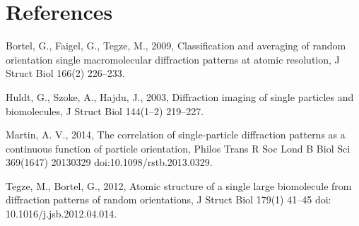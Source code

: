 \documentclass[12pt, letterpaper]{article}
\begin{document}
\section*{References}\raggedright
\begin{trivlist}
\item
Bortel, G., Faigel, G., Tegze, M., 2009,
Classification and averaging of random orientation single macromolecular diffraction patterns at atomic resolution,
J Struct Biol 166(2) 226--233.
\item
Huldt, G., Szoke, A., Hajdu, J., 2003,
Diffraction imaging of single particles and biomolecules,
J Struct Biol 144(1--2) 219--227.
\item
Martin, A. V., 2014,
The correlation of single-particle diffraction patterns as a continuous function of particle orientation,
Philos Trans R Soc Lond B Biol Sci 369(1647) 20130329 doi:10.1098/rstb.2013.0329.
\item
Tegze, M., Bortel, G., 2012,
Atomic structure of a single large biomolecule from diffraction patterns of random orientations,
J Struct Biol 179(1) 41--45 doi: 10.1016/j.jsb.2012.04.014.
\end{trivlist}
\end{document}
